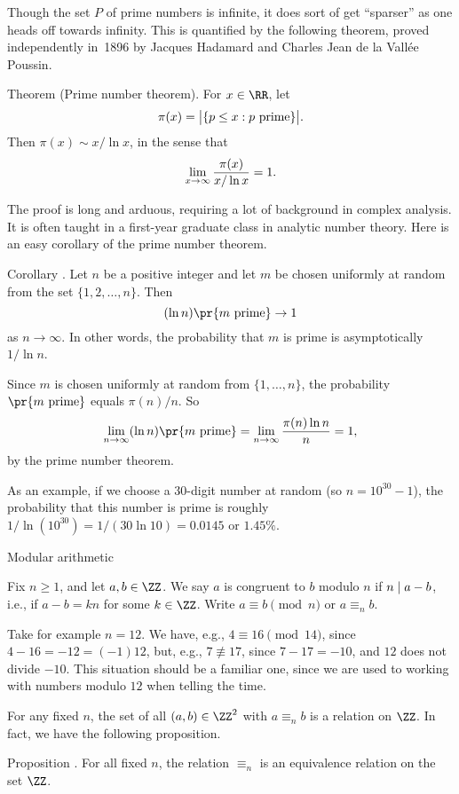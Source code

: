 Though the set $P$ of prime numbers is infinite, it does sort of get ``sparser'' as one heads off
towards infinity. This is quantified by the following theorem, proved independently
in~1896 by Jacques Hadamard and Charles Jean de la Vall\'ee Poussin.

\edef\thmpnt{\the\thmcount}
\parenproclaim Theorem {\advthm} (Prime number theorem). For $x\in \RR$, let
$$\pi(x) = \bigl| \{ p \le x : p\ \hbox{prime}\} \bigr|.$$
Then $\pi(x) \sim x/\ln x$, in the sense that
$$\lim_{x\to\infty} {\pi(x)\over x/\ln x} = 1.$$

The proof is long and arduous, requiring a lot of background in complex analysis.
It is often taught in a first-year graduate class in analytic number theory.
Here is an easy corollary of the prime number theorem.

\proclaim Corollary \advthm. Let $n$ be a positive integer and let $m$ be chosen
uniformly at random from the set $\{1,2,\ldots, n\}$. Then
$$(\ln n)\pr\{m\ \hbox{prime}\}\to 1$$
as $n\to\infty$. In other words, the probability that $m$ is prime is asymptotically
$1/\ln n$.

\proof Since $m$ is chosen uniformly at random from $\{1,\ldots,n\}$,
the probability $\pr\{ m\ \hbox{prime}\}$ equals $\pi(n)/ n$. So
$$\lim_{n\to\infty} (\ln n) \pr\{m\ \hbox{prime}\} = \lim_{n\to\infty} {\pi(n) \ln n\over n} 
= 1,$$
by the prime number theorem.\slug

As an example, if we choose a $30$-digit number at random (so $n=10^{30} - 1$), the
probability that this number is prime is roughly $1/\ln(10^{30}) = 1/(30\ln 10) = 0.0145$
or $1.45\%$.

\advsect Modular arithmetic

Fix $n\ge 1$, and let $a,b\in\ZZ$. We say {$a$ is congruent to $b$ modulo $n$}
if $n\mid a-b$, i.e., if $a-b = kn$ for some $k\in \ZZ$. Write $a \equiv b\pmod n$
or $a \equiv_n b$.

Take for example $n=12$. We have, e.g., $4\equiv 16\pmod 14$, since $4-16 = -12 = (-1)12$,
but, e.g., $7\not\equiv 17$, since $7-17 = -10$, and $12$ does not divide $-10$. This
situation should be a familiar one, since we are used to working with numbers modulo $12$ when
telling the time.

For any fixed $n$, the set of all $(a,b)\in \ZZ^2$ with $a\equiv_n b$ is a relation on $\ZZ$.
In fact, we have the following proposition.

\proclaim Proposition \advthm.
For all fixed $n$, the relation $\equiv_n$ is an equivalence relation on the set $\ZZ$.

